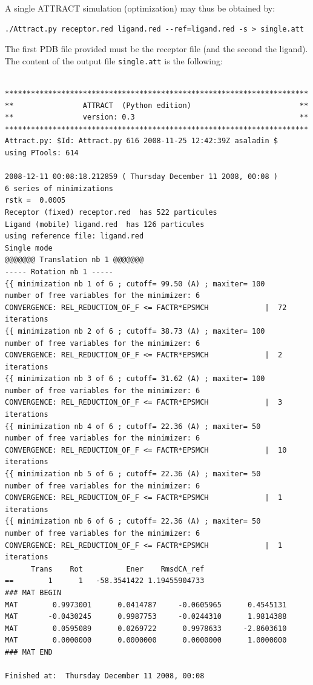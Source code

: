 \documentclass[12pt,a4paper]{article}
\begin{document}
A single ATTRACT simulation (optimization) may thus be obtained by:
\begin{verbatim}
./Attract.py receptor.red ligand.red --ref=ligand.red -s > single.att
\end{verbatim}

The first PDB file provided must be the receptor file (and the second the ligand).
The content of the output file {\tt single.att} is the following:

\newpage
\linenumbers*
\begin{verbatim}

**********************************************************************
**                ATTRACT  (Python edition)                         **
**                version: 0.3                                      **
**********************************************************************
Attract.py: $Id: Attract.py 616 2008-11-25 12:42:39Z asaladin $
using PTools: 614

2008-12-11 00:08:18.212859 ( Thursday December 11 2008, 00:08 )
6 series of minimizations
rstk =  0.0005
Receptor (fixed) receptor.red  has 522 particules
Ligand (mobile) ligand.red  has 126 particules
using reference file: ligand.red
Single mode
@@@@@@@ Translation nb 1 @@@@@@@
----- Rotation nb 1 -----
{{ minimization nb 1 of 6 ; cutoff= 99.50 (A) ; maxiter= 100
number of free variables for the minimizer: 6
CONVERGENCE: REL_REDUCTION_OF_F <= FACTR*EPSMCH             |  72 iterations
{{ minimization nb 2 of 6 ; cutoff= 38.73 (A) ; maxiter= 100
number of free variables for the minimizer: 6
CONVERGENCE: REL_REDUCTION_OF_F <= FACTR*EPSMCH             |  2 iterations
{{ minimization nb 3 of 6 ; cutoff= 31.62 (A) ; maxiter= 100
number of free variables for the minimizer: 6
CONVERGENCE: REL_REDUCTION_OF_F <= FACTR*EPSMCH             |  3 iterations
{{ minimization nb 4 of 6 ; cutoff= 22.36 (A) ; maxiter= 50
number of free variables for the minimizer: 6
CONVERGENCE: REL_REDUCTION_OF_F <= FACTR*EPSMCH             |  10 iterations
{{ minimization nb 5 of 6 ; cutoff= 22.36 (A) ; maxiter= 50
number of free variables for the minimizer: 6
CONVERGENCE: REL_REDUCTION_OF_F <= FACTR*EPSMCH             |  1 iterations
{{ minimization nb 6 of 6 ; cutoff= 22.36 (A) ; maxiter= 50
number of free variables for the minimizer: 6
CONVERGENCE: REL_REDUCTION_OF_F <= FACTR*EPSMCH             |  1 iterations
      Trans    Rot          Ener    RmsdCA_ref
==        1      1   -58.3541422 1.19455904733
### MAT BEGIN
MAT        0.9973001      0.0414787     -0.0605965      0.4545131 
MAT       -0.0430245      0.9987753     -0.0244310      1.9814388 
MAT        0.0595089      0.0269722      0.9978633     -2.8603610 
MAT        0.0000000      0.0000000      0.0000000      1.0000000 
### MAT END

Finished at:  Thursday December 11 2008, 00:08

\end{verbatim}
\nolinenumbers
\end{document}
